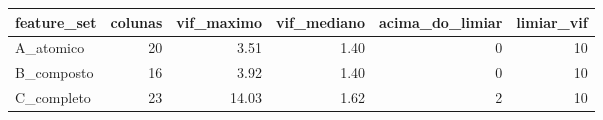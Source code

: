 \begin{tabular}{lrrrrr}
\toprule
feature_set & colunas & vif_maximo & vif_mediano & acima_do_limiar & limiar_vif \\
\midrule
A_atomico & 20 & 3.51 & 1.40 & 0 & 10 \\
B_composto & 16 & 3.92 & 1.40 & 0 & 10 \\
C_completo & 23 & 14.03 & 1.62 & 2 & 10 \\
\bottomrule
\end{tabular}
